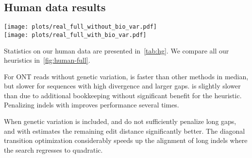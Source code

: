 \subsection{Human data results}\label{app:human}



\begin{figure*}[H]
  \centering
  \texttt{[image: plots/real\_full\_without\_bio\_var.pdf]}\\
  \texttt{[image: plots/real\_full\_with\_bio\_var.pdf]}%
  \caption[Runtime on long reads of human data]{\textbf{Runtime on long reads of
    human data} (logarithmic, $\geq 500\kbp$). Each dot corresponds to an
    alignment of a sequence pair. The ONT reads are without (top) and with
    (bottom) genetic variation. Runtime is capped at $\qty{100}{s}$.}
  \label{fig:human-full}
\end{figure*}

Statistics on our human data are presented in~\cref{tab:hg}. We compare all our
heuristics in~\cref{fig:human-full}.

For ONT reads without genetic variation, \SH is faster than other methods in
median, but slower for sequences with high divergence and larger gaps.
\CSH is slightly slower than \SH due to additional bookkeeping without
significant benefit for the heuristic. Penalizing indels with \GCH improves
performance several times.

When genetic variation is included, \SH and \CSH do not sufficiently penalize
long gaps, and \A with \GCH estimates the remaining edit distance significantly
better. The diagonal transition optimization considerably speeds up the
alignment of long indels where the search regresses to quadratic.
